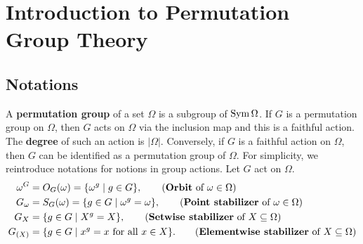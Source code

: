\section{Introduction to Permutation Group Theory}
\subsection{Notations}
A \textbf{permutation group} of a set $\Omega$ is a subgroup of $\operatorname{Sym}\Omega$. If $G$ is a permutation group on $\Omega$, then $G$ acts on $\Omega$ via the inclusion map and this is a faithful action. The \textbf{degree} of such an action is $|\Omega|$.  Conversely, if $G$ is a faithful action on $\Omega$, then $G$ can be identified as a permutation group of $\Omega$. For simplicity, we reintroduce notations for notions in group actions. Let $G$ act on $\Omega$.  
\begin{align*}
	\omega^G &= O_G(\omega) =\{\omega^g\mid g\in G\}, \tag{\textbf{Orbit} of $\omega \in \Omega$}
	\\
	G_{\omega} &= S_G(\omega) = \{g\in G\mid \omega^g = \omega\}, \tag{\textbf{Point stabilizer} of $\omega\in \Omega$}
	\\
	G_{X} &=  \{g\in G\mid X^g = X\}, \tag{\textbf{Setwise stabilizer} of $X\subseteq \Omega$}
	\\
	G_{(X)} &=  \{g\in G\mid x^g = x\text{ for all }x\in X\}. \tag{\textbf{Elementwise stabilizer} of $X\subseteq \Omega$}
\end{align*}
